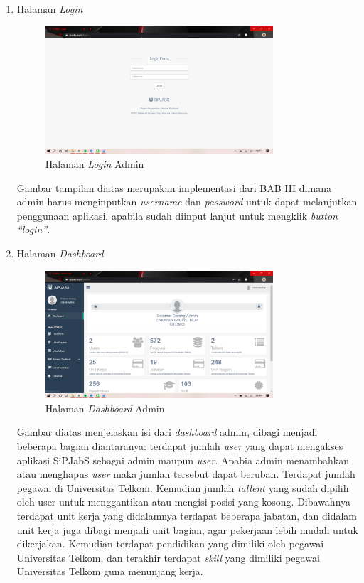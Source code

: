 \begin{enumerate}
	
	\item Halaman \textit{Login}
	\begin{figure}
		\centering
		\includegraphics[width=0.8\textwidth]
		{pics/admin/implementasi/login.png}
		\caption{Halaman \textit{Login} Admin}
		\label{fig:CC10}
	\end{figure}

	Gambar tampilan diatas merupakan implementasi dari BAB III dimana admin harus menginputkan \textit{username} dan \textit{password} untuk dapat melanjutkan penggunaan aplikasi, apabila sudah diinput lanjut untuk mengklik \textit{button “login”}. 
	
	\newpage
	\item Halaman \textit{Dashboard}
	\begin{figure}
		\centering
		\includegraphics[width=0.8\textwidth]
		{pics/admin/implementasi/dashboard.png}
		\caption{Halaman \textit{Dashboard} Admin}
		\label{fig:CC10}
	\end{figure}
	Gambar diatas menjelaskan isi dari \textit{dashboard} admin, dibagi menjadi beberapa bagian diantaranya: terdapat jumlah \textit{user} yang dapat mengakses aplikasi SiPJabS sebagai admin maupun \textit{user}. Apabia admin menambahkan atau menghapus \textit{user} maka jumlah tersebut dapat berubah. Terdapat jumlah pegawai di Universitas Telkom. Kemudian jumlah \textit{tallent} yang sudah dipilih oleh user untuk menggantikan atau mengisi posisi yang kosong. Dibawahnya terdapat unit kerja yang didalamnya terdapat beberapa jabatan, dan didalam unit kerja juga dibagi menjadi unit bagian, agar pekerjaan lebih mudah untuk dikerjakan. Kemudian terdapat pendidikan yang dimiliki oleh pegawai Universitas Telkom, dan terakhir terdapat \textit{skill} yang dimiliki pegawai Universitas Telkom guna menunjang kerja.
	

\end{enumerate}
